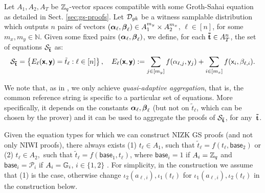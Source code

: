 Let $A_1,A_2,A_T$ be $\mathbb{Z}_q$-vector spaces compatible with some 
Groth-Sahai equation as detailed in Sect.
\ref{sec:gs-proofs}.  Let $\mathcal{D}_{{gk}}$ be a witness samplable distribution which outputs $n$ pairs of vectors
$({\boldsymbol \alpha}_\ell, {\boldsymbol \beta}_\ell) \in A_1^{m_y} \times A_2^{m_x}$, $\ell \in [n]$, for some 
$m_x,m_y \in \mathbb{N}$. Given some fixed pairs $({\boldsymbol \alpha}_\ell,
{\boldsymbol \beta}_\ell)$, we define, for each $\mathbf{\tilde{t}} \in A_{T}^{n}$, the set of equations $\mathcal{S}_{\mathbf{\tilde{t}}}$ as:
$$\mathcal{S}_{\mathbf{\tilde{t}}}=\left\{ E_{\ell}(\textbf{\textsf{x}},\textbf{\textsf{y}})=\tilde{t}_{\ell}: \ell \in [n]\right\},  \quad 
E_{\ell}(\textbf{\textsf{x}},\textbf{\textsf{y}}):=\sum_{j\in[m_y]} f(\alpha_{\ell,j}, \mathsf{y}_j) + 
\sum_{i\in[m_x]}  f(\mathsf{x}_i, \beta_{\ell,i}).$$  

We note that, as in \cite{C:JutRoy14}, we only achieve \textit{quasi-adaptive aggregation}, that is, the common reference string is specific to a particular set of equations. More specifically, it depends on the constants ${\boldsymbol \alpha}_{\ell},{\boldsymbol \beta}_{\ell}$ (but not on $\tilde{t}_{\ell}$, which can be chosen by the prover) and it can be used to aggregate the proofs of 
$\mathcal{S}_{\mathbf{\tilde{t}}}$, for any~$\mathbf{\tilde{t}}$.  

Given the equation types for which we can construct NIZK GS proofs (and not only NIWI proofs), there always exists (1) $t_{\ell} \in A_1$, such that $\tilde{t}_{\ell}=f(t_{\ell},\mathsf{base}_{2})$ or 
 (2) ${t}_{\ell} \in A_2,$ such that $\tilde{t}_{\ell}=f(\mathsf{base}_{1},t_{\ell})$, where $\mathsf{base}_{i}=1$ if $A_i=\mathbb{Z}_q$ and $\mathsf{base}_i=\mathcal{P}_i$ if $A_i=\mathbb{G}_i$, $i \in \{1,2\}$ \cite{SIAMJC:GroSah12}. For simplicity, 
 in the construction we assume that (1) is the case, otherwise 
 change $\iota_2(a_{\ell,i}),  \iota_1(t_{\ell})$ for $\iota_1(a_{\ell,i}),  \iota_2(t_{\ell})$ in the construction below. 

